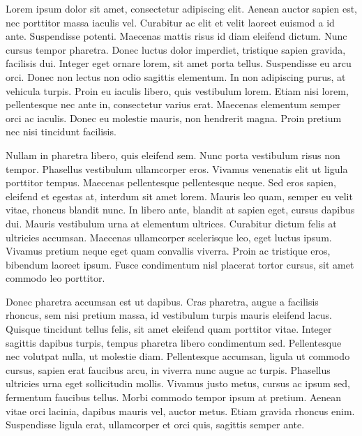 Lorem ipsum dolor sit amet, consectetur adipiscing elit. Aenean auctor sapien est, nec porttitor massa iaculis vel. Curabitur ac elit et velit laoreet euismod a id ante. Suspendisse potenti. Maecenas mattis risus id diam eleifend dictum. Nunc cursus tempor pharetra. Donec luctus dolor imperdiet, tristique sapien gravida, facilisis dui. Integer eget ornare lorem, sit amet porta tellus. Suspendisse eu arcu orci. Donec non lectus non odio sagittis elementum. In non adipiscing purus, at vehicula turpis. Proin eu iaculis libero, quis vestibulum lorem. Etiam nisi lorem, pellentesque nec ante in, consectetur varius erat. Maecenas elementum semper orci ac iaculis. Donec eu molestie mauris, non hendrerit magna. Proin pretium nec nisi tincidunt facilisis.

Nullam in pharetra libero, quis eleifend sem. Nunc porta vestibulum risus non tempor. Phasellus vestibulum ullamcorper eros. Vivamus venenatis elit ut ligula porttitor tempus. Maecenas pellentesque pellentesque neque. Sed eros sapien, eleifend et egestas at, interdum sit amet lorem. Mauris leo quam, semper eu velit vitae, rhoncus blandit nunc. In libero ante, blandit at sapien eget, cursus dapibus dui. Mauris vestibulum urna at elementum ultrices. Curabitur dictum felis at ultricies accumsan. Maecenas ullamcorper scelerisque leo, eget luctus ipsum. Vivamus pretium neque eget quam convallis viverra. Proin ac tristique eros, bibendum laoreet ipsum. Fusce condimentum nisl placerat tortor cursus, sit amet commodo leo porttitor.

Donec pharetra accumsan est ut dapibus. Cras pharetra, augue a facilisis rhoncus, sem nisi pretium massa, id vestibulum turpis mauris eleifend lacus. Quisque tincidunt tellus felis, sit amet eleifend quam porttitor vitae. Integer sagittis dapibus turpis, tempus pharetra libero condimentum sed. Pellentesque nec volutpat nulla, ut molestie diam. Pellentesque accumsan, ligula ut commodo cursus, sapien erat faucibus arcu, in viverra nunc augue ac turpis. Phasellus ultricies urna eget sollicitudin mollis. Vivamus justo metus, cursus ac ipsum sed, fermentum faucibus tellus. Morbi commodo tempor ipsum at pretium. Aenean vitae orci lacinia, dapibus mauris vel, auctor metus. Etiam gravida rhoncus enim. Suspendisse ligula erat, ullamcorper et orci quis, sagittis semper ante.
